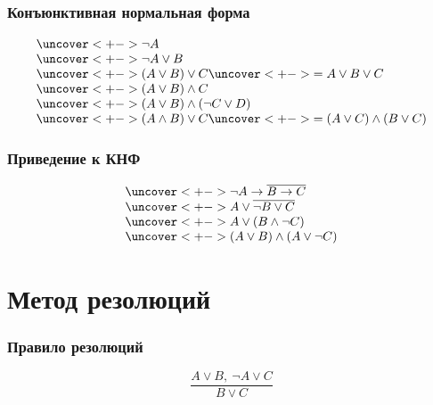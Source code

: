 \documentclass[24pt,pdf,hyperref={unicode},aspectratio=169]{beamer}
\begin{document}
\begin{frame}\frametitle{Конъюнктивная нормальная форма}
$$
\begin{array}{l}
\uncover<+->{ \neg A } \\
\uncover<+->{ \neg A \vee B } \\
\uncover<+->{ (A \vee B) \vee C } \uncover<+->{ = A\vee B\vee C }\\
\uncover<+->{ (A\vee B)\wedge C } \\
\uncover<+->{ (A\vee B)\wedge (\neg C\vee D) } \\
\uncover<+->{ (A \wedge B) \vee C } \uncover<+->{ = (A\vee C)\wedge (B\vee C)}\\
\end{array}
$$
\end{frame}

\begin{frame}\frametitle{Приведение к КНФ}
$$
\begin{array}{l}
\uncover<+->{\neg A\rightarrow \overline{B\rightarrow C}}\\
\uncover<+->{ A \vee \overline{\neg B \vee C }} \\
\uncover<+->{ A \vee (B \wedge \neg C) } \\
\uncover<+->{ (A\vee B) \wedge (A \vee \neg C) }
\end{array}
$$
\end{frame}

\section{Метод резолюций}

\begin{frame}\frametitle{Правило резолюций}
{\huge
$$
\frac{A\vee B,\ \neg A \vee C}{B \vee C}
$$
}
\end{frame}
\end{document}
